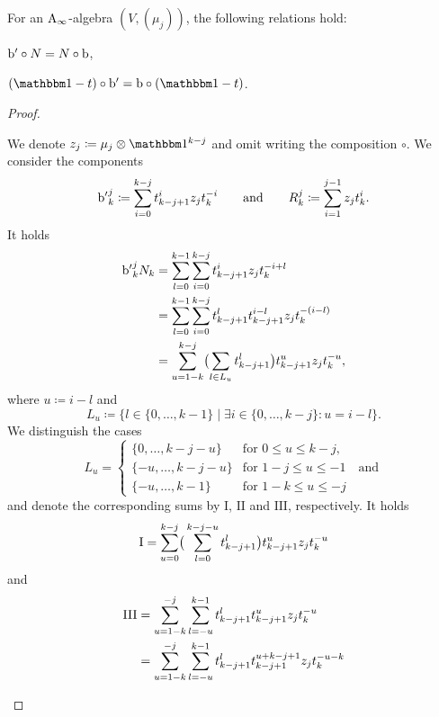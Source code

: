 \documentclass[\MainFolder/Text.tex]{subfiles}
\begin{document}
\begin{Lemma}[CP2] \label{Lem:CP2}
For an $\mathrm{A}_\infty$-algebra $(V,(\mu_j))$, the following relations hold:
\begin{ClaimList}
\item $\mathrm{b}'\circ N = N\circ \mathrm{b}$,
\item $(\Id-\CycPermOp)\circ \Hd' = \Hd\circ (\Id-\CycPermOp)$.
\end{ClaimList}
\end{Lemma}
\begin{proof}
\begin{ProofList}
\item We denote $z_j \coloneqq \mu_j \otimes \Id^{k-j}$ and omit writing the composition $\circ$. We consider the components
\[ {\mathrm{b}'}_k^j \coloneqq \sum_{i=0}^{k-j} t^i_{k-j+1}z_jt_k^{-i} \qquad\text{and}\qquad R_k^j \coloneqq \sum_{i=1}^{j-1} z_jt_k^i. \]
It holds
\begin{align*} 
{\mathrm{b}'}_k^j N_k &= \sum_{l=0}^{k-1}\sum_{i=0}^{k-j} t^i_{k-j+1} z_j t^{-i + l}_k \\
& = \sum_{l=0}^{k-1} \sum_{i=0}^{k-j} t^l_{k-j+1} t^{i-l}_{k-j+1} z_j t^{-(i-l)}_k \\
& = \sum_{u=1-k}^{k-j} \bigl(\sum_{l\in L_u} t^l_{k-j+1}\bigr) t^u_{k-j+1} z_j t^{-u}_k,
\end{align*}
where $u \coloneqq i - l$ and 
\[L_u \coloneqq \{ l\in \{0, \dotsc, k-1\} \mid \exists i\in \{0,\dotsc, k-j\} : u = i-l \}. \] 
We distinguish the cases
\[ L_u = \begin{cases}
         \{0,\dotsc, k-j-u\} & \text{for }0\le u \le k-j, \\
         \{-u, \dotsc, k-j-u\} & \text{for } 1-j \le u \le -1\quad\text{and} \\
         \{-u, \dotsc, k -1\} & \text{for }1-k \le u \le -j
         \end{cases}\]
and denote the corresponding sums by $\mathrm{I}$, $\mathrm{II}$ and $\mathrm{III}$, respectively. It holds         
\[ \mathrm{I} = \sum_{u=0}^{k-j} \bigr(\sum_{l=0}^{k-j-u} t^l_{k-j+1} \bigl) t^u_{k-j+1} z_j t^{-u}_k \]
and  
\begin{align*}
\mathrm{III} &= \sum_{u = 1- k}^{-j} \sum_{l = -u}^{k-1} \CycPermOp^l_{k-j+1} \CycPermOp^u_{k-j+1} z_j \CycPermOp^{-u}_k \\
& = \sum_{u = 1- k}^{-j} \sum_{l = -u}^{k-1} \CycPermOp^l_{k-j+1} \CycPermOp^{u+k-j+1}_{k-j+1} z_j \CycPermOp^{-u-k}_k  \\

\end{align*}
\end{ProofList}
\end{proof}
\end{document}
